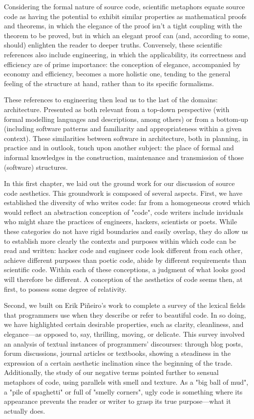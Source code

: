 Considering the formal nature of source code, scientific metaphors equate source code as having the potential to exhibit similar properties as mathematical proofs and theorems, in which the elegance of the proof isn't a tight coupling with the theorem to be proved, but in which an elegant proof can (and, according to some, should) enlighten the reader to deeper truths. Conversely, these scientific references also include engineering, in which the applicability, its correctness and efficiency are of prime importance: the conception of elegance, accompanied by economy and efficiency, becomes a more holistic one, tending to the general feeling of the structure at hand, rather than to its specific formalisms.

These references to engineering then lead us to the last of the domains: architecture. Presented as both relevant from a top-down perspective (with formal modelling languages and descriptions, among others) or from a bottom-up (including software patterns and familiarity and appropriateness within a given context). These similarities between software in architecture, both in planning, in practice and in outlook, touch upon another subject: the place of formal and informal knowledges in the construction, maintenance and transmission of those (software) structures.

\spacer

In this first chapter, we laid out the ground work for our discussion of source code aesthetics. This groundwork is composed of several aspects. First, we have established the diversity of who writes code: far from a homogeneous crowd which would reflect an abstraction conception of "code", code writers include inviduals who might share the practices of engineers, hackers, scientists or poets. While these categories do not have rigid boundaries and easily overlap, they do allow us to establish more clearly the contexts and purposes within which code can be read and written: hacker code and engineer code look different from each other, achieve different purposes than poetic code, abide by different requirements than scientific code. Within each of these conceptions, a judgment of what looks good will therefore be different. A conception of the aesthetics of code seems then, at first, to possess some degree of relativity.

Second, we built on Erik Piñeiro's work to complete a survey of the lexical fields that programmers use when they describe or refer to beautiful code. In so doing, we have highlighted certain desirable properties, such as clarity, cleanliness, and elegance—as opposed to, say, thrilling, moving, or delicate. This survey involved an analysis of textual instances of programmers' discourses: through blog posts, forum discussions, journal articles or textbooks, showing a steadiness in the expression of a certain aesthetic inclination since the beginning of the trade. Additionally, the study of our negative terms pointed further to sensual metaphors of code, using parallels with smell and texture. As a "big ball of mud", a "pile of spaghetti" or full of "smelly corners", ugly code is something where its appearance prevents the reader or writer to grasp its true purpose—what it actually does.

